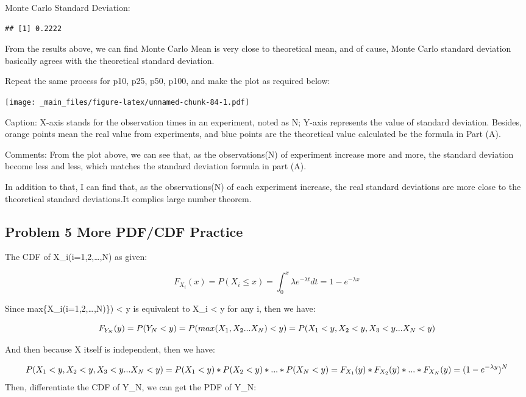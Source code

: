 \documentclass[
]{article}
\begin{document}
Monte Carlo Standard Deviation:

\begin{verbatim}
## [1] 0.2222
\end{verbatim}

From the results above, we can find Monte Carlo Mean is very close to theoretical mean, and of cause, Monte Carlo standard deviation basically agrees with the theoretical standard deviation.

Repeat the same process for p10, p25, p50, p100, and make the plot as required below:

\texttt{[image: \_main\_files/figure-latex/unnamed-chunk-84-1.pdf]}

Caption: X-axis stands for the observation times in an experiment, noted as N; Y-axis represents the value of standard deviation. Besides, orange points mean the real value from experiments, and blue points are the theoretical value calculated be the formula in Part (A).

Comments: From the plot above, we can see that, as the observations(N) of experiment increase more and more, the standard deviation become less and less, which matches the standard deviation formula in part (A).

In addition to that, I can find that, as the observations(N) of each experiment increase, the real standard deviations are more close to the theoretical standard deviations.It complies large number theorem.

\hypertarget{problem-5-more-pdfcdf-practice}{%
\subsection{Problem 5 More PDF/CDF Practice}\label{problem-5-more-pdfcdf-practice}}

The CDF of X\_i(i=1,2,\ldots,N) as given:

\[
F_{X_i}(x) = P(X_i≤x) = \int_{0}^{x} \lambda e^{-\lambda t}dt = 1- e^{-\lambda x}
\]

Since max\{X\_i(i=1,2,\ldots,N)\}) \textless{} y is equivalent to X\_i \textless{} y for any i, then we have:

\[
F_{Y_N}(y) = P(Y_N < y) \\= P(max(X_1,X_2...X_N)<y) \\= P(X_1<y,X_2<y,X_3<y...X_N<y)
\]

And then because X itself is independent, then we have:

\[
P(X_1<y,X_2<y,X_3<y...X_N<y) \\= P(X_1<y) *P(X_2<y) *...*P(X_N<y) \\= F_{X_1}(y)*F_{X_2}(y)*...*F_{X_N}(y) \\= (1- e^{-\lambda y})^N
\]
Then, differentiate the CDF of Y\_N, we can get the PDF of Y\_N:
\end{document}
